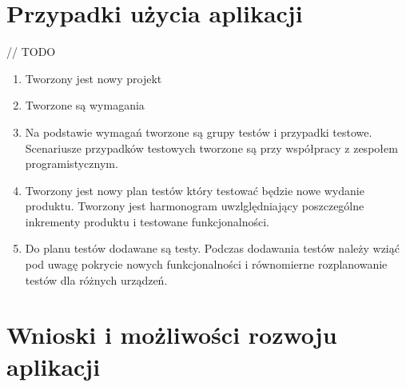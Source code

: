 \chapter{Przypadki użycia aplikacji}
// TODO 
\begin{enumerate}
  \item Tworzony jest nowy projekt
  \item Tworzone są wymagania
  \item Na podstawie wymagań tworzone są grupy testów i przypadki testowe. Scenariusze przypadków testowych tworzone są przy współpracy z zespołem programistycznym.
  \item Tworzony jest nowy plan testów który testować będzie nowe wydanie produktu. Tworzony jest harmonogram uwzlględniający poszczególne inkrementy produktu i testowane funkcjonalności.
  \item Do planu testów dodawane są testy. Podczas dodawania testów należy wziąć pod uwagę pokrycie nowych funkcjonalności i równomierne rozplanowanie testów dla różnych urządzeń.

\end{enumerate}

\chapter{Wnioski i możliwości rozwoju aplikacji}
